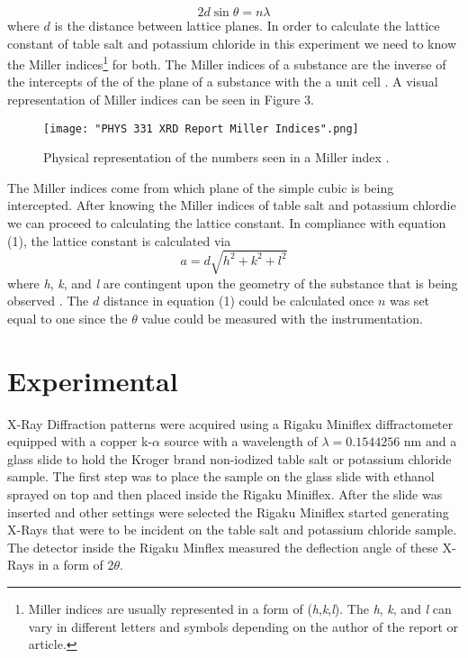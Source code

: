 \documentclass[twocolumn]{article}
\begin{document}
\begin{equation}\label{1}
2d\sin{\theta}=n\lambda
\end{equation}
where $d$ is the distance between lattice planes. In order to calculate the lattice constant of table salt and potassium chloride in this experiment we need to know the Miller indices\footnote{Miller indices are usually represented in a form of (\textit{h},\textit{k},\textit{l}). The \textit{h}, \textit{k}, and \textit{l} can vary in different letters and symbols depending on the author of the report or article.} for both. The Miller indices of a substance are the inverse of the intercepts of the of the plane of a substance with the a unit cell \cite{WikiCrystal}. A visual representation of Miller indices can be seen in Figure 3.
\begin{figure}[htbp]
\begin{center}
\texttt{[image: "PHYS 331 XRD Report Miller Indices".png]}
\caption{Physical representation of the numbers seen in a Miller index \cite{WikiCrystal}.}
\label{Fig3}
\end{center}
\end{figure}
\newpage
The Miller indices come from which plane of the simple cubic is being intercepted. After knowing the Miller indices of table salt and potassium chlordie we can proceed to calculating the lattice constant. In compliance with equation (1), the lattice constant is calculated via
\begin{equation}\label{2}
a=d\sqrt{h^2+k^2+l^2}
\end{equation}
where \textit{h}, \textit{k}, and \textit{l} are contingent upon the geometry of the substance that is being observed \cite{X-RayCryst}. The $d$ distance in equation (1) could be calculated once $n$ was set equal to one since the $\theta$ value could be measured with the instrumentation.
\section*{Experimental}
X-Ray Diffraction patterns were acquired using a Rigaku Miniflex diffractometer equipped with a copper k-$\alpha$ source with a wavelength of $\lambda=0.1544256$ nm and a glass slide to hold the Kroger brand non-iodized table salt or potassium chloride sample. The first step was to place the sample on the glass slide with ethanol sprayed on top and then placed inside the Rigaku Miniflex. After the slide was inserted and other settings were selected the Rigaku Miniflex started generating X-Rays that were to be incident on the table salt and potassium chloride sample. The detector inside the Rigaku Minflex measured the deflection angle of these X-Rays in a form of 2$\theta$. 
\end{document}
